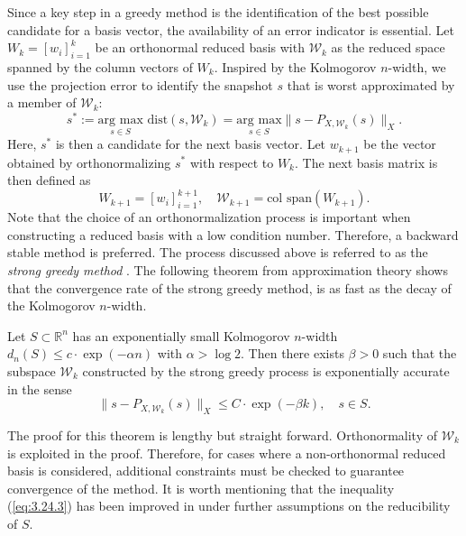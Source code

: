 Since a key step in a greedy method is the identification of the best possible candidate for a basis vector, the availability of an error indicator is essential. Let $W_k = [ w_i ]_{i=1}^k$ be an orthonormal reduced basis with $\mathcal W_k$ as the reduced space spanned by the column vectors of $W_k$. Inspired by the Kolmogorov $n$-width, we use the projection error to identify the snapshot $s$ that is worst approximated by a member of $\mathcal W_k$:
\begin{equation} \label{eq:3.24.1}
	s^* := \underset{s\in S}{\text{arg\ max} } \text{\ dist}(s,\mathcal W_k)
= \underset{s\in S}{\text{arg\ max} } \| s - P_{X,\mathcal W_k}(s) \|_X. \end{equation}
Here, $s^*$ is then a candidate for the next basis vector. Let $w_{k+1}$ be the vector obtained by orthonormalizing $s^*$ with respect to $W_k$. The next basis matrix is then defined as
\begin{equation} \label{eq:3.24.2}
	W_{k+1} = [w_i]_{i=1}^{k+1}, \quad \mathcal W_{k+1} = \text{col\ span}(W_{k+1}). 
\end{equation}
Note that the choice of an orthonormalization process is important when constructing a reduced basis with a low condition number. Therefore, a backward stable method is preferred. The process discussed above is referred to as the \emph{strong greedy method} \cite{quarteroni2015reduced}. The following theorem from approximation theory shows that the convergence rate of the strong greedy method, is as fast as the decay of the Kolmogorov $n$-width. 
\begin{theorem}
	\cite{doi:10.1137/100795772} Let $S\subset \mathbb R^{n}$ has an exponentially small Kolmogorov $n$-width $d_n(S) \leq c\cdot \exp(-\alpha n)$ with $\alpha > \log 2$. Then there exists $\beta > 0$ such that the subspace $\mathcal W_k$ constructed by the strong greedy process is exponentially accurate in the sense
\begin{equation} \label{eq:3.24.3}
	\| s - P_{X,\mathcal W_k}(s) \|_X \leq C\cdot \exp(-\beta k), \quad s \in S.
\end{equation}
\end{theorem}
The proof for this theorem is lengthy but straight forward. Orthonormality of $\mathcal W_k$ is exploited in the proof. Therefore, for cases where a non-orthonormal reduced basis is considered, additional constraints must be checked to guarantee convergence of the method. It is worth mentioning that the inequality (\ref{eq:3.24.3}) has been improved in \cite{buffa2012priori} under further assumptions on the reducibility of $S$. 

